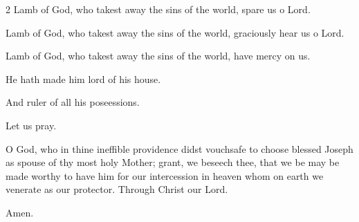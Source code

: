 \begin{enpars}
\begin{multicols}{2}
Lamb of God, who takest away
the sins of the world, spare us o Lord.

Lamb of God, who takest away
the sins of the world, graciously hear us o Lord.

Lamb of God, who takest away the sins of the world, 
have mercy on us.
\end{multicols}

\vv He hath made him lord of his house.

\rr And ruler of all his poseessions.

Let us pray.

\lettrine{O}{} God, who in thine ineffible
providence didst vouchsafe  to choose blessed
Joseph as spouse of thy most holy Mother; grant, we beseech thee, that we be may be made worthy
to have him for our intercession in heaven
whom on earth we venerate as our protector.
Through Christ our Lord. 

\rr Amen.
\end{enpars}